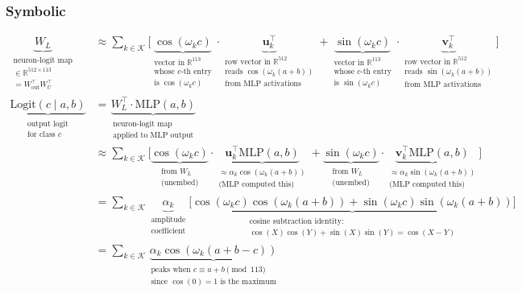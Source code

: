 \documentclass[11pt,a4paper]{article}
\begin{document}
\subsubsection*{Symbolic}
\begin{align}
    \underbrace{W_L}_{\substack{\text{neuron-logit map} \\ \in \mathbb{R}^{512 \times 113} \\ = W_{\text{out}}^\top W_U^\top}} &\approx \sum_{k \in \mathcal{K}} \bigg[ \underbrace{\cos(\omega_k c)}_{\substack{\text{vector in } \mathbb{R}^{113} \\ \text{whose } c\text{-th entry} \\ \text{is } \cos(\omega_k c)}} \cdot \underbrace{\mathbf{u}_k^\top}_{\substack{\text{row vector in } \mathbb{R}^{512} \\ \text{reads } \cos(\omega_k(a+b)) \\ \text{from MLP activations}}} + \underbrace{\sin(\omega_k c)}_{\substack{\text{vector in } \mathbb{R}^{113} \\ \text{whose } c\text{-th entry} \\ \text{is } \sin(\omega_k c)}} \cdot \underbrace{\mathbf{v}_k^\top}_{\substack{\text{row vector in } \mathbb{R}^{512} \\ \text{reads } \sin(\omega_k(a+b)) \\ \text{from MLP activations}}} \bigg] \\
    \underbrace{\text{Logit}(c \mid a, b)}_{\substack{\text{output logit} \\ \text{for class } c}} &= \underbrace{W_L^\top \cdot \text{MLP}(a,b)}_{\substack{\text{neuron-logit map} \\ \text{applied to MLP output}}} \\
    &\approx \sum_{k \in \mathcal{K}} \bigg[ \underbrace{\cos(\omega_k c)}_{\substack{\text{from } W_L \\ \text{(unembed)}}} \cdot \underbrace{\mathbf{u}_k^\top \text{MLP}(a,b)}_{\substack{\approx \alpha_k \cos(\omega_k(a+b)) \\ \text{(MLP computed this)}}} + \underbrace{\sin(\omega_k c)}_{\substack{\text{from } W_L \\ \text{(unembed)}}} \cdot \underbrace{\mathbf{v}_k^\top \text{MLP}(a,b)}_{\substack{\approx \alpha_k \sin(\omega_k(a+b)) \\ \text{(MLP computed this)}}} \bigg] \\
    &= \sum_{k \in \mathcal{K}} \underbrace{\alpha_k}_{\substack{\text{amplitude} \\ \text{coefficient}}} \underbrace{\Big[\cos(\omega_k c)\cos(\omega_k(a+b)) + \sin(\omega_k c)\sin(\omega_k(a+b))\Big]}_{\substack{\text{cosine subtraction identity:} \\ \cos(X)\cos(Y) + \sin(X)\sin(Y) = \cos(X - Y)}} \\
    &= \boxed{\sum_{k \in \mathcal{K}} \underbrace{\alpha_k \cos\!\left(\omega_k(a + b - c)\right)}_{\substack{\text{peaks when } c \equiv a+b \pmod{113} \\\text{since } \cos(0) = 1 \text{ is the maximum}}}}
\end{align}
\end{document}
